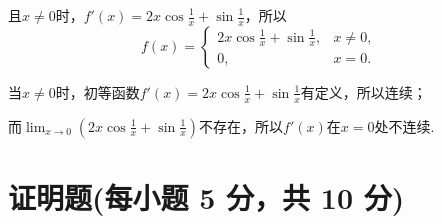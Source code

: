 \documentclass[../Main.tex]{subfiles}
\begin{document}
\begin{enumerate}
      且$x\neq0$时，$f'(x)=2x\cos\frac{1}{x}+\sin\frac{1}{x}$，所以
      \[
        f(x)=
        \begin{cases}
          2x\cos\frac{1}{x}+\sin\frac{1}{x}, & x\neq 0, \\
          0,                                 & x=0.
        \end{cases}
      \]

      当$x\neq0$时，初等函数$f'(x)=2x\cos\frac{1}{x}+\sin\frac{1}{x}$有定义，所以连续；

      而$\lim_{x\to0}\left(2x\cos\frac{1}{x}+\sin\frac{1}{x}\right)$不存在，所以$f
      '(x)$在$x=0$处不连续.
  \end{enumerate}

  \section{证明题(每小题 5 分，共 10 分)}
\end{document}
